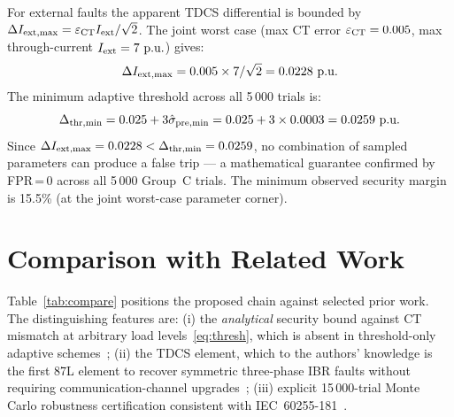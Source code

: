\documentclass[journal,twoside,10pt]{IEEEtran}
\newcommand{\pu}{\,\text{p.u.}}
\begin{document}
For external faults the apparent TDCS differential is bounded by
$\Delta I_{\rm ext,max} = \varepsilon_{\rm CT} I_{\rm ext}/\sqrt{2}$.
The joint worst case (max CT error $\varepsilon_{\rm CT} = 0.005$,
max through-current $I_{\rm ext} = 7\,\pu$) gives:
\begin{equation}
  \Delta I_{\rm ext,max} = 0.005 \times 7/\sqrt{2} = 0.0228\,\pu
  \label{eq:ext_worst}
\end{equation}
The minimum adaptive threshold across all 5\,000 trials is:
\begin{equation}
  \Delta_{\rm thr,min} = 0.025 + 3\hat{\sigma}_{\rm pre,min}
                       = 0.025 + 3\times 0.0003 = 0.0259\,\pu
  \label{eq:thr_min_mc}
\end{equation}
Since $\Delta I_{\rm ext,max} = 0.0228 < \Delta_{\rm thr,min} = 0.0259$,
no combination of sampled parameters can produce a false trip ---
a mathematical guarantee confirmed by FPR\,=\,0 across all 5\,000
Group~C trials.  The minimum observed security margin is 15.5\%
(at the joint worst-case parameter corner).

\section{Comparison with Related Work}
\label{sec:comparison}

Table~\ref{tab:compare} positions the proposed chain against selected
prior work.  The distinguishing features are:
(i) the \emph{analytical} security bound against CT mismatch at arbitrary
load levels~\eqref{eq:thresh}, which is absent in threshold-only adaptive
schemes~\cite{Brahma2004,Saleh2017};
(ii) the TDCS element, which to the authors' knowledge is the first 87L
element to recover symmetric three-phase IBR faults without requiring
communication-channel upgrades~\cite{IEEE_C37_243,Schweitzer2014};
(iii) explicit 15\,000-trial Monte Carlo robustness certification
consistent with IEC~60255-181~\cite{IEC_60255_181}.
\end{document}
